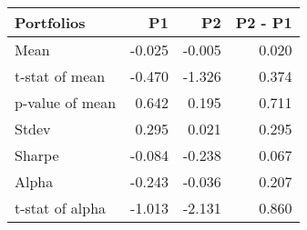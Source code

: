 \begin{tabular}{lrrr}
\toprule
Portfolios & P1 & P2 & P2 - P1 \\
\midrule
Mean & -0.025 & -0.005 & 0.020 \\
t-stat of mean & -0.470 & -1.326 & 0.374 \\
p-value of mean & 0.642 & 0.195 & 0.711 \\
Stdev & 0.295 & 0.021 & 0.295 \\
Sharpe & -0.084 & -0.238 & 0.067 \\
Alpha & -0.243 & -0.036 & 0.207 \\
t-stat of alpha & -1.013 & -2.131 & 0.860 \\
\bottomrule
\end{tabular}
